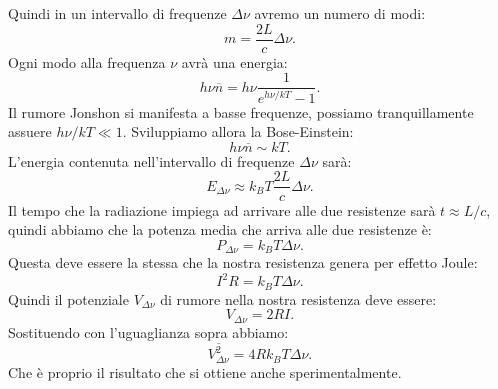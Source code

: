 Quindi in un intervallo di frequenze $\Delta \nu $ avremo un numero di modi:
\[
	m = \frac{2L}{c}\Delta \nu 
.\] 
Ogni modo alla frequenza $\nu $ avrà una energia:
\[
	h\nu \overline{n} = h\nu \frac{1}{e^{h\nu /kT}-1}
.\] 
Il rumore Jonshon si manifesta a basse frequenze, possiamo tranquillamente assuere $h\nu /kT \ll 1$. Sviluppiamo allora la Bose-Einstein:
\[
	h\nu \overline{n} \sim kT
.\] 
L'energia contenuta nell'intervallo di frequenze $\Delta \nu $ sarà:
\[
	E_{\Delta \nu } \approx k_BT \frac{2L}{c}\Delta \nu 
.\] 
Il tempo che la radiazione impiega ad arrivare alle due resistenze sarà $t\approx L /c$, quindi abbiamo che la potenza media che arriva alle due resistenze è:
\[
	P_{\Delta \nu }= k_B T\Delta \nu 
.\] 
Questa deve essere la stessa che la nostra resistenza genera per effetto Joule:
\[
	I^2R = k_BT\Delta \nu 
.\] 
Quindi il potenziale $V_{\Delta \nu}$ di rumore nella nostra resistenza deve essere:
\[
	V_{\Delta \nu } = 2RI
.\] 
Sostituendo con l'uguaglianza sopra abbiamo:
\[
	\overline{V_{\Delta \nu }^2}= 4Rk_BT\Delta \nu 
.\] 
Che è proprio il risultato che si ottiene anche sperimentalmente.

